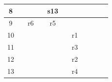 \documentclass{article}
\begin{document}
\begin{latin}
\begin{table}[H]
\begin{tabular}{|ccccccccccc|}
\multicolumn{1}{|c|}{{\color[HTML]{0000FF} 8}}         & \multicolumn{1}{c|}{}           & \multicolumn{1}{c|}{}           & \multicolumn{1}{c|}{}           & \multicolumn{1}{c|}{s13}        & \multicolumn{1}{c|}{}           & \multicolumn{1}{c|}{}                           & \multicolumn{1}{c|}{}            & \multicolumn{1}{c|}{}                         & \multicolumn{1}{c|}{}                         &                          \\ \hline
\multicolumn{1}{|c|}{{\color[HTML]{0000FF} 9}}         & \multicolumn{1}{c|}{}           & \multicolumn{1}{c|}{r6}         & \multicolumn{1}{c|}{}           & \multicolumn{1}{c|}{r5}         & \multicolumn{1}{c|}{}           & \multicolumn{1}{c|}{}                           & \multicolumn{1}{c|}{}            & \multicolumn{1}{c|}{}                         & \multicolumn{1}{c|}{}                         &                          \\ \hline
\multicolumn{1}{|c|}{{\color[HTML]{0000FF} 10}}        & \multicolumn{1}{c|}{}           & \multicolumn{1}{c|}{}           & \multicolumn{1}{c|}{}           & \multicolumn{1}{c|}{}           & \multicolumn{1}{c|}{}           & \multicolumn{1}{c|}{r1}                         & \multicolumn{1}{c|}{}            & \multicolumn{1}{c|}{}                         & \multicolumn{1}{c|}{}                         &                          \\ \hline
\multicolumn{1}{|c|}{{\color[HTML]{0000FF} 11}}        & \multicolumn{1}{c|}{}           & \multicolumn{1}{c|}{}           & \multicolumn{1}{c|}{}           & \multicolumn{1}{c|}{}           & \multicolumn{1}{c|}{}           & \multicolumn{1}{c|}{r3}                         & \multicolumn{1}{c|}{}            & \multicolumn{1}{c|}{}                         & \multicolumn{1}{c|}{}                         &                          \\ \hline
\multicolumn{1}{|c|}{{\color[HTML]{0000FF} 12}}        & \multicolumn{1}{c|}{}           & \multicolumn{1}{c|}{}           & \multicolumn{1}{c|}{}           & \multicolumn{1}{c|}{}           & \multicolumn{1}{c|}{}           & \multicolumn{1}{c|}{r2}                         & \multicolumn{1}{c|}{}            & \multicolumn{1}{c|}{}                         & \multicolumn{1}{c|}{}                         &                          \\ \hline
\multicolumn{1}{|c|}{{\color[HTML]{0000FF} 13}}        & \multicolumn{1}{c|}{}           & \multicolumn{1}{c|}{}           & \multicolumn{1}{c|}{}           & \multicolumn{1}{c|}{}           & \multicolumn{1}{c|}{}           & \multicolumn{1}{c|}{r4}                         & \multicolumn{1}{c|}{}            & \multicolumn{1}{c|}{}                         & \multicolumn{1}{c|}{}                         &                          \\ \hline
\end{tabular}
\end{table}
\end{latin}
\end{document}
